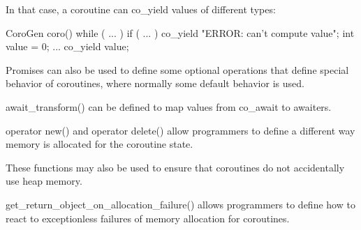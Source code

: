 In that case, a coroutine can co\_yield values of different types:

\begin{cpp}
CoroGen coro()
{
	while ( ... ) {
		if ( ... ) {
			co_yield "ERROR: can't compute value";
		}
		int value = 0;
		...
		co_yield value;
	}
}
\end{cpp}


Promises can also be used to define some optional operations that define special behavior of coroutines, where normally some default behavior is used.


await\_transform() can be defined to map values from co\_await to awaiters.


operator new() and operator delete() allow programmers to define a different way memory is allocated for the coroutine state.

These functions may also be used to ensure that coroutines do not accidentally use heap memory.


get\_return\_object\_on\_allocation\_failure() allows programmers to define how to react to exceptionless failures of memory allocation for coroutines.








